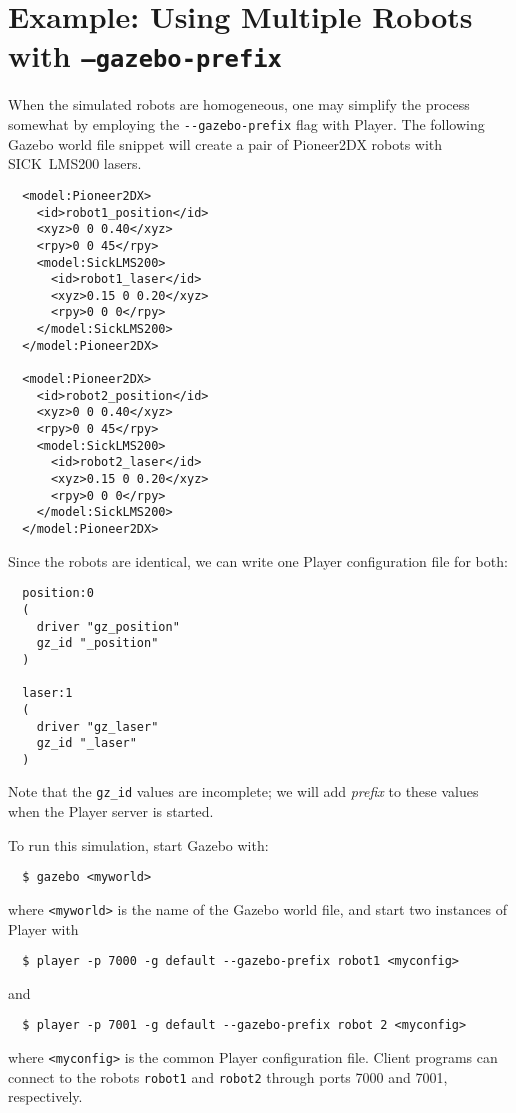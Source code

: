 \section{Example: Using Multiple Robots with {\tt --gazebo-prefix}}

When the simulated robots are homogeneous, one may simplify the
process somewhat by employing the \verb+--gazebo-prefix+ flag with
Player.
%
The following Gazebo world file snippet will create a pair of
Pioneer2DX robots with SICK~LMS200 lasers.
\begin{verbatim}
  <model:Pioneer2DX>
    <id>robot1_position</id>
    <xyz>0 0 0.40</xyz>
    <rpy>0 0 45</rpy>
    <model:SickLMS200>
      <id>robot1_laser</id>
      <xyz>0.15 0 0.20</xyz>
      <rpy>0 0 0</rpy>
    </model:SickLMS200>
  </model:Pioneer2DX>

  <model:Pioneer2DX>
    <id>robot2_position</id>
    <xyz>0 0 0.40</xyz>
    <rpy>0 0 45</rpy>
    <model:SickLMS200>
      <id>robot2_laser</id>
      <xyz>0.15 0 0.20</xyz>
      <rpy>0 0 0</rpy>
    </model:SickLMS200>
  </model:Pioneer2DX>
\end{verbatim}
Since the robots are identical, we can write one Player configuration
file for both:
\begin{verbatim}
  position:0
  (
    driver "gz_position"
    gz_id "_position"
  )

  laser:1
  (
    driver "gz_laser"
    gz_id "_laser"
  )
\end{verbatim}
Note that the \verb+gz_id+ values are incomplete; we will add {\em
prefix} to these values when the Player server is started.

To run this simulation, start Gazebo with:
\begin{verbatim}
  $ gazebo <myworld>
\end{verbatim} %
where \verb+<myworld>+ is the name of the Gazebo world file,
and start two instances of Player with
\begin{verbatim}
  $ player -p 7000 -g default --gazebo-prefix robot1 <myconfig>
\end{verbatim} %
and
\begin{verbatim}
  $ player -p 7001 -g default --gazebo-prefix robot 2 <myconfig>
\end{verbatim} %
where \verb+<myconfig>+ is the common Player configuration file.
%
Client programs can connect to the robots \verb+robot1+ and
\verb+robot2+ through ports 7000 and 7001, respectively.


